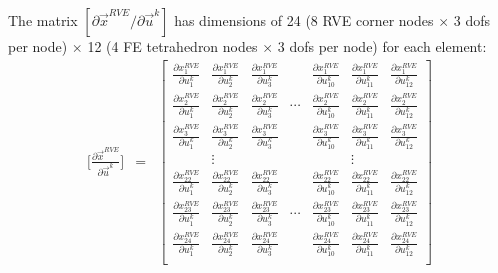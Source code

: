 The matrix $[\partial \vec{x}^{RVE}/\partial \vec{u}^k]$ has dimensions of 24 (8 RVE corner nodes $\times$ 3 dofs per node) $\times$ 12 (4 FE tetrahedron nodes $\times$ 3 dofs per node) for each element: 
%
\setcounter{MaxMatrixCols}{12}
\begin{eqnarray}
\bigg[ \frac{\partial \vec{x}^{RVE}}{\partial \vec{u}^k} \bigg] &=& 
\begin{bmatrix}
\frac{\partial x_1^{RVE}}{\partial u_1^k} & \frac{\partial x_1^{RVE}}{\partial u_2^k} & \frac{\partial x_1^{RVE}}{\partial u_3^k} & &
%
 \frac{\partial x_1^{RVE}}{\partial u_{10}^k} & \frac{\partial x_1^{RVE}}{\partial u_{11}^k} & \frac{\partial x_1^{RVE}}{\partial u_{12}^k} \\
\frac{\partial x_2^{RVE}}{\partial u_1^k} & \frac{\partial x_2^{RVE}}{\partial u_2^k} & \frac{\partial x_2^{RVE}}{\partial u_3^k} & \cdots &
%
\frac{\partial x_2^{RVE}}{\partial u_{10}^k} & \frac{\partial x_2^{RVE}}{\partial u_{11}^k} & \frac{\partial x_2^{RVE}}{\partial u_{12}^k} \\
\frac{\partial x_3^{RVE}}{\partial u_1^k} & \frac{\partial x_3^{RVE}}{\partial u_2^k} & \frac{\partial x_3^{RVE}}{\partial u_3^k} &  &
%
\frac{\partial x_3^{RVE}}{\partial u_{10}^k} & \frac{\partial x_3^{RVE}}{\partial u_{11}^k} & \frac{\partial x_3^{RVE}}{\partial u_{12}^k} \\
 & \vdots & & & & \vdots & \\
\frac{\partial x_{22}^{RVE}}{\partial u_1^k} & \frac{\partial x_{22}^{RVE}}{\partial u_2^k} & \frac{\partial x_{22}^{RVE}}{\partial u_3^k} & &
%
 \frac{\partial x_{22}^{RVE}}{\partial u_{10}^k} & \frac{\partial x_{22}^{RVE}}{\partial u_{11}^k} & \frac{\partial x_{22}^{RVE}}{\partial u_{12}^k} \\
\frac{\partial x_{23}^{RVE}}{\partial u_1^k} & \frac{\partial x_{23}^{RVE}}{\partial u_2^k} & \frac{\partial x_{23}^{RVE}}{\partial u_3^k} & \cdots &
%
\frac{\partial x_{23}^{RVE}}{\partial u_{10}^k} & \frac{\partial x_{23}^{RVE}}{\partial u_{11}^k} & \frac{\partial x_{23}^{RVE}}{\partial u_{12}^k} \\
\frac{\partial x_{24}^{RVE}}{\partial u_1^k} & \frac{\partial x_{24}^{RVE}}{\partial u_2^k} & \frac{\partial x_{24}^{RVE}}{\partial u_3^k} &  &
%
\frac{\partial x_{24}^{RVE}}{\partial u_{10}^k} & \frac{\partial x_{24}^{RVE}}{\partial u_{11}^k} & \frac{\partial x_{24}^{RVE}}{\partial u_{12}^k} \\
\end{bmatrix} \nonumber\\

\end{eqnarray}
